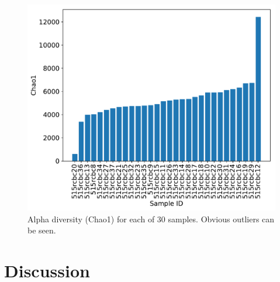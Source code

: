 \documentclass{article}
\begin{document}
\begin{multicols}{2}
\begin{figure}
	\includegraphics[width=\linewidth]{../analyses/figs/chao1_alpha.pdf}
	\caption{Alpha diversity (Chao1) for each of 30 samples. Obvious outliers can be seen.}
	\label{fig:alpha_diversity}
\end{figure}
\section{Discussion}
\newpage



\end{multicols}
\end{document}
